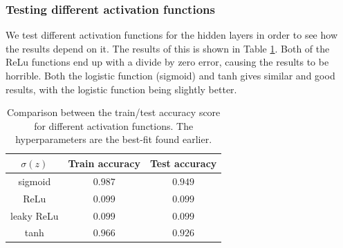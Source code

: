 \documentclass[a4paper]{article}
\begin{document}
\subsubsection*{Testing different activation functions}
We test different activation functions for the hidden layers in order to see how the results depend on it. The results of this is shown in Table \ref{tab:mnist_actfunc}. Both of the ReLu functions end up with a divide by zero error, causing the results to be horrible. Both the logistic function (sigmoid) and tanh gives similar and good results, with the logistic function being slightly better.
\begin{table}[H]
  \centering
  \caption{Comparison between the train/test accuracy score for different activation functions. The hyperparameters are the best-fit found earlier.}
  \label{tab:mnist_actfunc}
  \begin{tabular}{c|c|c}
    \hline\hline
    $\sigma(z)$ & Train accuracy & Test accuracy\\\hline
	sigmoid & $0.987$ & $0.949$ \\
	ReLu & $0.099$ & $0.099$ \\
	leaky ReLu & $0.099$ & $0.099$ \\
	tanh & $0.966$ & $0.926$ \\
    \end{tabular}
\end{table}
\end{document}
